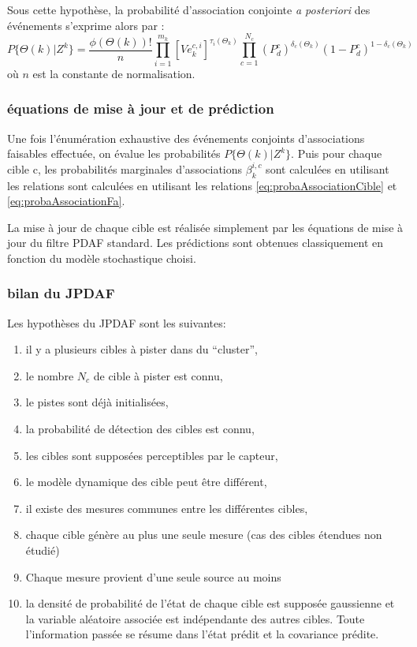 \documentclass[10pt,french,a4paper]{report}
\begin{document}
 	  
Sous cette hypothèse, la probabilité d'association conjointe \textit{a posteriori} des événements s'exprime alors par :
 	  	 \begin{equation}
 P\{\Theta(k) | Z^{k} \}= \frac{\phi(\Theta(k))!}{n} \prod_{i=1}^{m_k}   {[V e_k^{c,i}]}^ {\tau_i(\Theta_k)} \prod _{c=1}^{N_c} (P_d^c)^{\delta_c(\Theta_k)}(1-P_d^c)^{1 - \delta_c(\Theta_k)}
 	  \end{equation}  
 où $n$ est la constante de normalisation. 
 	  
  \subsubsection{équations de mise à jour et de prédiction}
  Une fois l'énumération exhaustive des événements conjoints d'associations faisables effectuée, on évalue
les probabilités $ P\{\Theta(k) | Z^{k} \}$. Puis pour chaque cible c, les probabilités marginales d'associations $\beta_k^{i,c}$ sont calculées en utilisant les relations sont calculées en utilisant les relations \ref{eq:probaAssociationCible} et \ref{eq:probaAssociationFa}.
  
  La mise à jour de chaque cible est réalisée simplement par les équations de mise à jour du filtre \ac{PDAF} standard. Les prédictions sont obtenues classiquement en fonction du modèle stochastique choisi. 
  \subsubsection{bilan du \ac{JPDAF}}
  Les hypothèses du \ac{JPDAF} sont les suivantes: 
  
  \begin{enumerate}[label = \arabic*.]
  \item il y a plusieurs cibles à pister dans du ``cluster'',
  \item le nombre $N_c$ de cible à pister est connu,
  \item le pistes sont déjà initialisées,
  \item la probabilité de détection des cibles est connu,
  \item les cibles sont supposées perceptibles par le capteur,
  \item le modèle dynamique des cible peut être différent,
  \item il existe des mesures communes entre les différentes cibles, 
\item chaque cible génère au plus une seule mesure (cas des cibles étendues non étudié) 
\item Chaque mesure provient d'une seule source au moins
\item la densité de probabilité de l'état de chaque cible est supposée gaussienne et la variable aléatoire associée est indépendante des autres cibles.   Toute l'information passée se résume dans l'état prédit et la covariance prédite. 
  \end{enumerate}
  
\end{document}
